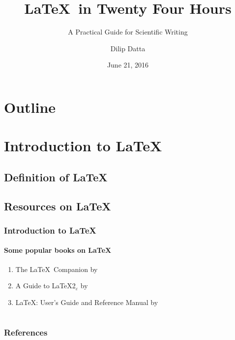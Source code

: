 \documentclass{beamer}
\title[\LaTeX\ in 24H]{\LaTeX\ in Twenty Four Hours}
\subtitle{A Practical Guide for Scientific Writing}
\author[D. Datta]{Dilip Datta}
\institute[\LaTeX-LT]{\LaTeX\ Learners Team}
\date[L24H :: 21-06-2016]{June 21, 2016}
\begin{document}
    \frame[plain]{\titlepage}
    \section*{Outline}
    \section[Introduction]{Introduction to \LaTeX}
    \subsection[Definition]{Definition of \LaTeX}
    \subsection[Resources]{Resources on \LaTeX}
    \begin{frame}[t]
    \frametitle{Introduction to \LaTeX} \framesubtitle{Some popular books on \LaTeX}
    \begin{enumerate}
    \item The \LaTeX\ Companion by \citet{Datta-Figueira-2013}
    \item A Guide to \LaTeX2$_\varepsilon$ by \citet{Deb-2001}
    \item \LaTeX: User's Guide and Reference Manual by \citet{Burke-etal-1996}
    \end{enumerate}
    \end{frame}
    \section*{ }
    \begin{frame}[t]
    \frametitle{References}
     
    
    \end{frame}
\end{document}
